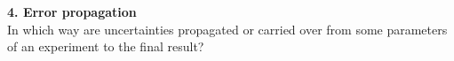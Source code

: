 \documentclass[12pt]{article}
\begin{document}
\newpage
{\large\bf 4. Error propagation}\\
In which way are uncertainties propagated or carried over from
some parameters of an experiment to the final result?\\
%
\end{document}
